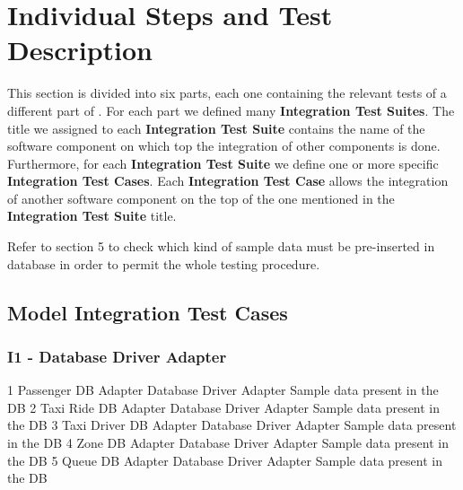 \section{Individual Steps and Test Description}


This section is divided into six parts, each one containing the relevant tests of a different part of \myTaxiService{}.
For each part we defined many \textbf{Integration Test Suites}.
The title we assigned to each \textbf{Integration Test Suite} contains the name of the software component on which top the integration of other components is done.
Furthermore, for each \textbf{Integration Test Suite} we define one or more specific \textbf{Integration Test Cases}.
Each \textbf{Integration Test Case} allows the integration of another software component on the top of the one mentioned in the \textbf{Integration Test Suite} title.\par
Refer to section 5 to check which kind of sample data must be pre-inserted in \myTaxiService{} database in order to permit the whole testing procedure.

\subsection{Model Integration Test Cases}
\subsubsection{I1 - Database Driver Adapter}
\testCaseSimpleSimple
	{1}
	{Passenger DB Adapter}
	{Database Driver Adapter}
	{Sample data present in the DB}
\testCaseSimpleSimple
	{2}
	{Taxi Ride DB Adapter}
	{Database Driver Adapter}
	{Sample data present in the DB}
\testCaseSimpleSimple
	{3}
	{Taxi Driver DB Adapter}
	{Database Driver Adapter}
	{Sample data present in the DB}
\testCaseSimpleSimple
	{4}
	{Zone DB Adapter}
	{Database Driver Adapter}
	{Sample data present in the DB}
\testCaseSimpleSimple
	{5}
	{Queue DB Adapter}
	{Database Driver Adapter}
	{Sample data present in the DB}
